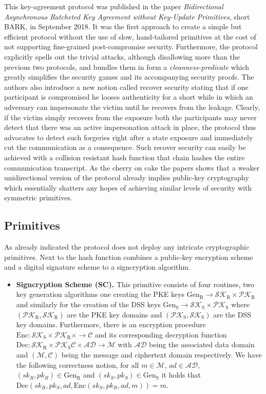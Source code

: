 \documentclass[11pt,a4paper,twoside,openright,bibliography=totoc]{scrbook}
\renewcommand{\t}{\text} %
\begin{document}
This key-agreement protocol was published in the paper
\textit{Bidirectional Asynchronous Ratcheted Key Agreement without
Key-Update Primitives}, short BARK, in September 2018. It was the first approach to
create a simple but efficient protocol without the use of slow,
hand-tailored primitives at the cost of not supporting fine-grained
post-compromise security. Furthermore, the protocol explicitly spells
out the trivial attacks, although disallowing more than the previous
two protocols, and bundles them in form a \textit{cleanness-predicate}
which greatly simplifies the security games and its accompanying
security proofs. The authors also introduce a new notion called
recover security stating that if one participant is compromised he
looses authenticity for a short while in which an adversary can
impersonate the victim until he recovers from the leakage. Clearly, if
the victim simply recovers from the exposure both the participants may
never detect that there was an active impersonation attack in place,
the protocol thus advocates to detect such forgeries right after a
state exposure and immediately cut the communication as a
consequence. Such recover security can easily be achieved with a
collision resistant hash function that chain hashes the entire
communication transcript. As the cherry on cake the papers shows that
a weaker unidirectional version of the protocol already implies
public-key cryptography which essentially shatters any hopes of
achieving similar levels of security with symmetric primitives.

\subsection{Primitives}
\label{sec:primitives-2}

As already indicated the protocol does not deploy any intricate
cryptographic primitives. Next to the hash function combines a
public-key encryption scheme and a digital signature scheme to
a signcryption algorithm.
\begin{itemize}
\item \textbf{Signcryption Scheme (SC).} This primitive consists of four routines,
  two key generation algorithms one creating the PKE keys
  $\t{Gen}_\t{R} \rightarrow \mathcal{SK}_\t{R} \times \mathcal{PK}_\t{R}$ and
  similarly for the creation of the DSS keys
  $\t{Gen}_\t{S} \rightarrow \mathcal{SK}_\t{S} \times \mathcal{PK}_\t{S}$ where
  $(\mathcal{PK}_\t{R},\mathcal{SK}_\t{R})$ are the PKE key domains and
  $(\mathcal{PK}_\t{S},\mathcal{SK}_\t{S})$ are the DSS key domains. Furthermore,
  there is an encryption procedure
  $\t{Enc}: \mathcal{SK}_\t{S} \times \mathcal{PK}_\t{R} \times
   \rightarrow \mathcal{C}$ and its corresponding
  decryption function
  $\t{Dec}: \mathcal{SK}_\t{R} \times \mathcal{PK}_\t{S}
  \mathcal{C} \times \mathcal{AD} \rightarrow \mathcal{M}$ with $\mathcal{AD}$
  being the associated data domain and $(\mathcal{M}, \mathcal{C})$ being
  the message and ciphertext domain respectively. We have the following
  correctness notion, for all $m \in \mathcal{M}$, $ad \in \mathcal{AD}$,
  $(sk_R,pk_R) \in \t{Gen}_\t{R}$ and $(sk_S,pk_S) \in \t{Gen}_\t{S}$ it
  holds that $\t{Dec}(sk_R,pk_S,ad,\t{Enc}(sk_S,pk_R,ad,m)) = m$.
\end{itemize}
\end{document}
